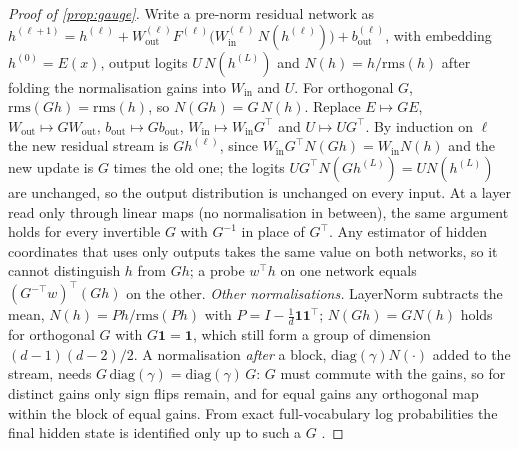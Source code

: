 \begin{proof}[Proof of \cref{prop:gauge}]
Write a pre-norm residual network as $h^{(\ell+1)}=h^{(\ell)}+W^{(\ell)}_{\mathrm{out}}
F^{(\ell)}\big(W^{(\ell)}_{\mathrm{in}}\,N(h^{(\ell)})\big)+b^{(\ell)}_{\mathrm{out}}$, with embedding $h^{(0)}=E(x)$, output logits
$U\,N(h^{(L)})$ and $N(h)=h/\mathrm{rms}(h)$ after folding the normalisation gains into $W_{\mathrm{in}}$ and $U$. For orthogonal
$G$, $\mathrm{rms}(Gh)=\mathrm{rms}(h)$, so $N(Gh)=G\,N(h)$. Replace $E\mapsto GE$, $W_{\mathrm{out}}\mapsto GW_{\mathrm{out}}$,
$b_{\mathrm{out}}\mapsto Gb_{\mathrm{out}}$, $W_{\mathrm{in}}\mapsto W_{\mathrm{in}}G^{\top}$ and $U\mapsto UG^{\top}$. By induction on
$\ell$ the new residual stream is $Gh^{(\ell)}$, since $W_{\mathrm{in}}G^\top N(Gh)=W_{\mathrm{in}}N(h)$ and the new update is $G$ times
the old one; the logits $UG^\top N(Gh^{(L)})=U N(h^{(L)})$ are unchanged, so the output distribution is unchanged on every
input. At a layer read only through linear maps (no normalisation in between), the same argument holds for every invertible
$G$ with $G^{-1}$ in place of $G^\top$. Any estimator of hidden coordinates that uses only outputs takes the same value on both
networks, so it cannot distinguish $h$ from $Gh$; a probe $w^\top h$ on one network equals $(G^{-\top}w)^\top(Gh)$ on the other.
\emph{Other normalisations.} LayerNorm subtracts the mean, $N(h)=Ph/\mathrm{rms}(Ph)$ with $P=I-\tfrac1d\mathbf 1\mathbf 1^\top$;
$N(Gh)=GN(h)$ holds for orthogonal $G$ with $G\mathbf 1=\mathbf 1$, which still form a group of dimension $(d-1)(d-2)/2$.
A normalisation \emph{after} a block, $\mathrm{diag}(\gamma)N(\cdot)$ added to the stream, needs $G\,\mathrm{diag}(\gamma)=
\mathrm{diag}(\gamma)\,G$: $G$ must commute with the gains, so for distinct gains only sign flips remain, and for equal gains any orthogonal map within
the block of equal gains. From exact full-vocabulary log probabilities the final hidden state is identified only up to such a
$G$ \citep{carlini2024stealing}.
\end{proof}

